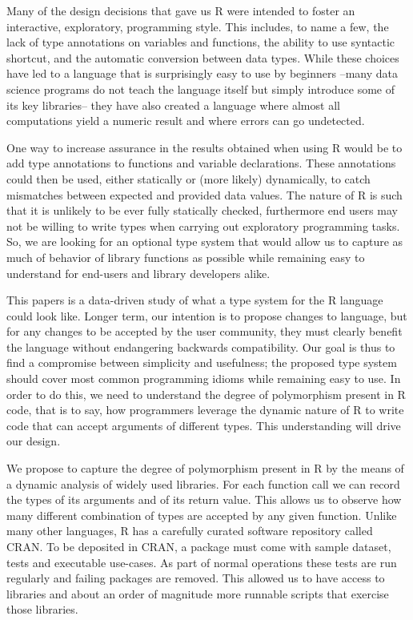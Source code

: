 \documentclass[acmsmall,10pt,review,anonymous]{acmart}\settopmatter{printfolios=true,printccs=false,printacmref=false}
\begin{document}
Many of the design decisions that gave us R were intended to foster an
interactive, exploratory, programming style. This includes, to name a few,
the lack of type annotations on variables and functions, the ability to use
syntactic shortcut, and the automatic conversion between data types.  While
these choices have led to a language that is surprisingly easy to use by
beginners --many data science programs do not teach the language itself but
simply introduce some of its key libraries-- they have also created a
language where almost all computations yield a numeric result and where
errors can go undetected.

One way to increase assurance in the results obtained when using R would be
to add type annotations to functions and variable declarations. These
annotations could then be used, either statically or (more likely)
dynamically, to catch mismatches between expected and provided data values.
The nature of R is such that it is unlikely to be ever fully statically
checked, furthermore end users may not be willing to write types when
carrying out exploratory programming tasks. So, we are looking for an
optional type system that would allow us to capture as much of behavior of
library functions as possible while remaining easy to understand for
end-users and library developers alike.

This papers is a data-driven study of what a type system for the R language
could look like. Longer term, our intention is to propose changes to
language, but for any changes to be accepted by the user community, they
must clearly benefit the language without endangering backwards
compatibility. Our goal is thus to find a compromise between simplicity and
usefulness; the proposed type system should cover most common programming
idioms while remaining easy to use. In order to do this, we need to
understand the degree of polymorphism present in R code, that is to say, how
programmers leverage the dynamic nature of R to write code that can accept
arguments of different types.  This understanding will drive our design.

We propose to capture the degree of polymorphism present in R by the means
of a dynamic analysis of widely used libraries. For each function call we
can record the types of its arguments and of its return value. This allows
us to observe how many different combination of types are accepted by any
given function. Unlike many other languages, R has a carefully curated
software repository called CRAN. To be deposited in CRAN, a package must
come with sample dataset, tests and executable use-cases. As part of normal
operations these tests are run regularly and failing packages are removed.
This allowed us to have access to \PACKAGES libraries and about an order of
magnitude more runnable scripts that exercise those libraries.
\end{document}
